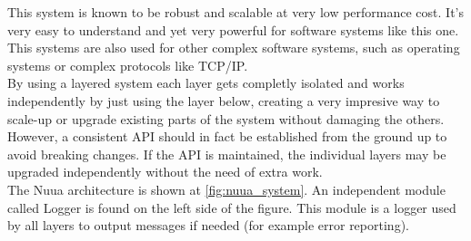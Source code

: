 This system is known to be robust and scalable at very low performance cost. It's very easy to understand and yet very powerful
for software systems like this one. This systems are also used for other complex software systems, such as operating
systems or complex protocols like TCP/IP.\\

\noindent
By using a layered system each layer gets completly isolated and works independently by just using the layer below,
creating a very impresive way to scale-up or upgrade existing parts of the system without damaging the others.
However, a consistent API should in fact be established from the ground up to avoid breaking changes.
If the API is maintained, the individual layers may be upgraded independently without the need of extra work.\\

\noindent
The Nuua architecture is shown at \autoref{fig:nuua_system}. An independent module called Logger is found
on the left side of the figure. This module is a logger used by all layers to output messages if needed (for example error reporting).

